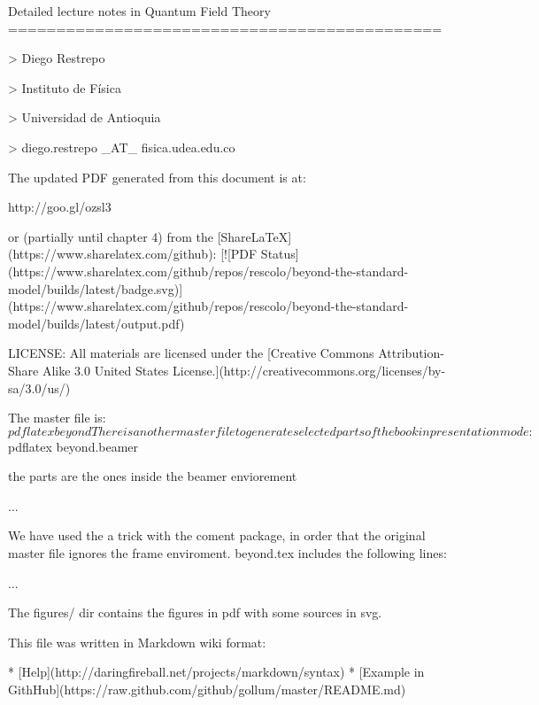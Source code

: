 Detailed lecture notes in Quantum Field Theory
=============================================



> Diego Restrepo

> Instituto de Física

> Universidad de Antioquia

> diego.restrepo _AT_ fisica.udea.edu.co

The updated PDF generated from this document is at:

http://goo.gl/ozsl3

or (partially until chapter 4) from the [ShareLaTeX](https://www.sharelatex.com/github): [![PDF Status](https://www.sharelatex.com/github/repos/rescolo/beyond-the-standard-model/builds/latest/badge.svg)](https://www.sharelatex.com/github/repos/rescolo/beyond-the-standard-model/builds/latest/output.pdf)

LICENSE: All materials are licensed under the [Creative Commons Attribution-Share Alike 3.0 United States License.](http://creativecommons.org/licenses/by-sa/3.0/us/)

The master file is:
    $ pdflatex beyond

There is another master file to generate selected parts of the book in
presentation mode:

    $ pdflatex beyond.beamer


the parts are the ones inside the beamer enviorement

    \begin{frame}
    ...
    \end{frame}

We have used the a trick with the coment package, in order that the
original master file ignores the frame enviroment. beyond.tex includes
the following lines:

    \usepackage{comment}
    ...	
    {\begingroup}{\endgroup}

The figures/ dir contains the figures in pdf with some sources in svg.

This file was written in Markdown wiki format: 

* [Help](http://daringfireball.net/projects/markdown/syntax)
* [Example in GithHub](https://raw.github.com/github/gollum/master/README.md)